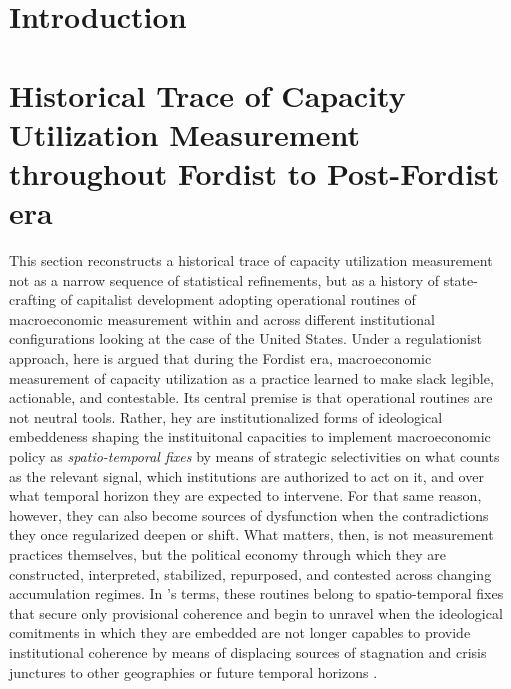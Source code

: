\documentclass[11pt,a4paper]{article}
\begin{document}
	

\tableofcontents

\pagebreak

\section{Introduction}

\section{Historical Trace of Capacity Utilization Measurement throughout Fordist to Post-Fordist era} 

This section reconstructs a historical trace of capacity utilization measurement not as a narrow sequence of statistical refinements, but as a history of state-crafting of capitalist development adopting operational routines of macroeconomic measurement within and across different institutional configurations looking at the case of the United States. Under a regulationist approach, here is argued that during the Fordist era, macroeconomic measurement of capacity utilization as a practice learned to make slack legible, actionable, and contestable. Its central premise is that operational routines are not neutral tools. Rather, hey are institutionalized forms of ideological embeddeness shaping the instituitonal capacities to implement macroeconomic policy as \textit{spatio-temporal fixes} by means of strategic selectivities on what counts as the relevant signal, which institutions are authorized to act on it, and over what temporal horizon they are expected to intervene. For that same reason, however, they can also become sources of dysfunction when the contradictions they once regularized deepen or shift. What matters, then, is not measurement practices themselves, but the political economy through which they are constructed, interpreted, stabilized, repurposed, and contested across changing accumulation regimes. In \citet{Jessop2003}'s terms, these routines belong to spatio-temporal fixes that secure only provisional coherence and begin to unravel when the ideological comitments in which they are embedded are not longer capables to provide institutional coherence by means of displacing sources of stagnation and crisis junctures to other geographies or future temporal horizons \citep{Jessop2006}. 
\end{document}
